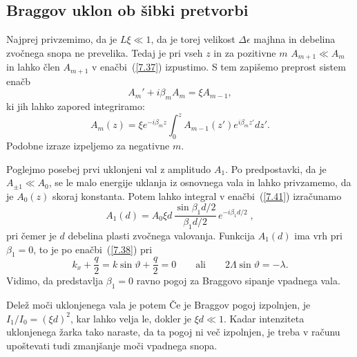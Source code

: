 \subsection*{Braggov uklon ob šibki pretvorbi}
Najprej privzemimo, da je $L\xi \ll 1$, da je torej velikost $\Delta \epsilon$
majhna in debelina zvočnega snopa ne prevelika. Tedaj je pri vseh
$z$ in za pozitivne $m$ $A_{m+1}\ll A_{m}$ in lahko člen $A_{m+1}$
v enačbi~(\ref{7.37}) izpustimo. S tem zapišemo preprost sistem enačb
\begin{equation}
A_{m}'+i\beta_{m}A_{m}=\xi A_{m-1},
\label{7.40}
\end{equation}
 ki jih lahko zapored integriramo: 
\begin{equation}
A_{m}(z)=\xi e^{-i\beta_{m}z}\int_{0}^{z}A_{m-1}(z')
e^{i\beta_{m}z'}dz'.
\label{7.41}
\end{equation}
Podobne izraze izpeljemo za negativne $m$.

Poglejmo posebej prvi uklonjeni val z amplitudo $A_{1}$. Po predpostavki,
da je $A_{\pm1}\ll A_{0}$, se le malo energije uklanja iz osnovnega
vala in lahko privzamemo, da je $A_{0}(z)$ skoraj konstanta. 
Potem lahko integral v enačbi~(\ref{7.41})
izračunamo
\begin{equation}
A_{1}(d)=A_{0}\xi d\,\frac{\sin\beta_{1}d/2}{\beta_{1}d/2}\, e^{-i\beta_{1}d/2}\;,
\label{7.41a}
\end{equation}
pri čemer je $d$ debelina plasti zvočnega valovanja.
Funkcija $A_{1}(d)$ ima vrh pri $\beta_{1}=0$, to je po enačbi~(\ref{7.38}) pri 
\begin{equation}
k_x+ \frac{q}{2} = k \sin\vartheta + \frac{q}{2} = 0
\qquad \mathrm{ali} \qquad 
2\Lambda\sin\vartheta=-\lambda.
\label{7.43}
\end{equation}
Vidimo, da predstavlja $\beta_{1}=0$ ravno pogoj za Braggovo sipanje vpadnega
vala.

Delež moči uklonjenega vala je potem
Če je Braggov pogoj izpolnjen, je $I_{1}/I_{0}=(\xi d)^{2}$,
kar lahko velja le, dokler je $\xi d\ll1$. Kadar intenziteta uklonjenega žarka
tako naraste, da ta pogoj ni več izpolnjen, je treba v računu upoštevati tudi 
zmanjšanje moči vpadnega snopa.

